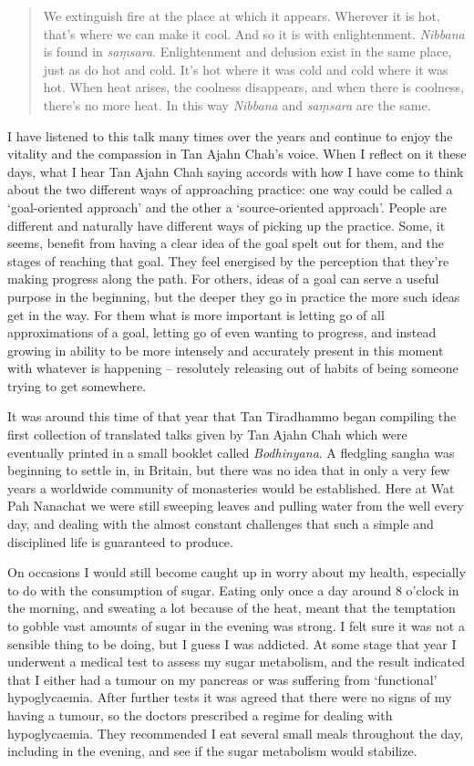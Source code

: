 \begin{quotation}
We extinguish fire at the place at which it appears. Wherever it is hot,
that's where we can make it cool. And so it is with enlightenment.
\emph{Nibbana} is found in \emph{saṃsara}. Enlightenment and delusion
exist in the same place, just as do hot and cold. It's hot where it was
cold and cold where it was hot. When heat arises, the coolness
disappears, and when there is coolness, there's no more heat. In this
way \emph{Nibbana} and \emph{saṃsara} are the same.
\end{quotation}

I have listened to this talk many times over the years and continue to
enjoy the vitality and the compassion in Tan Ajahn Chah's voice. When I
reflect on it these days, what I hear Tan Ajahn Chah saying accords with
how I have come to think about the two different ways of approaching
practice: one way could be called a `goal-oriented approach' and the
other a `source-oriented approach'. People are different and naturally
have different ways of picking up the practice. Some, it seems, benefit
from having a clear idea of the goal spelt out for them, and the stages
of reaching that goal. They feel energised by the perception that
they're making progress along the path. For others, ideas of a goal can
serve a useful purpose in the beginning, but the deeper they go in
practice the more such ideas get in the way. For them what is more
important is letting go of all approximations of a goal, letting go of
even wanting to progress, and instead growing in ability to be more
intensely and accurately present in this moment with whatever is happening -- resolutely releasing out of habits of being someone trying to get somewhere.

It was around this time of that year that Tan Tiradhammo began compiling
the first collection of translated talks given by Tan Ajahn Chah which
were eventually printed in a small booklet called \emph{Bodhinyana}. A
fledgling sangha was beginning to settle in, in Britain, but there was
no idea that in only a very few years a worldwide community of
monasteries\cite{forestsangha} would be established. Here
at Wat Pah Nanachat we were still sweeping leaves and pulling water from
the well every day, and dealing with the almost constant challenges that
such a simple and disciplined life is guaranteed to produce.

On occasions I would still become caught up in worry about my health,
especially to do with the consumption of sugar. Eating only once a day
around 8 o'clock in the morning, and sweating a lot because of the heat,
meant that the temptation to gobble vast amounts of sugar in the evening
was strong. I felt sure it was not a sensible thing to be doing, but I
guess I was addicted. At some stage that year I underwent a medical test
to assess my sugar metabolism, and the result indicated that I either
had a tumour on my pancreas or was suffering from `functional'
hypoglycaemia. After further tests it was agreed that there were no
signs of my having a tumour, so the doctors prescribed a regime for
dealing with hypoglycaemia. They recommended I eat several small meals
throughout the day, including in the evening, and see if the sugar
metabolism would stabilize.

